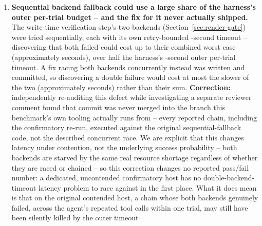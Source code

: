 \documentclass[11pt]{article}
\DeclareRobustCommand{\claim}[2]{#2}
\begin{document}
\begin{enumerate}
  (Section~\ref{sec:methods-statistics}), citation's reported numbers were never regenerated, so
  a -second timeout still counted as a failure. A later audit re-ran the fixed script on the same
  run data, moving citation's treatment arm to \% ($n=\val{single.cite.treatment.n}$); no code changed.
\item\label{def:seq-fallback} \claim{defect-6-numbered-refs}{\claim{concurrent-fallback-fix-never-shipped}{\textbf{Sequential backend fallback could use a large share of the harness's outer
  per-trial budget -- and \claim{defects-all-fixed-status}{the fix for it never actually shipped.}}}} \claim{sequential-backend-fallback-order}{The write-time verification
  step's two backends (Section~\ref{sec:render-gate})
  were tried sequentially,} each with its own retry-bounded -second timeout -- discovering that
  both failed could cost up to their combined worst case (approximately  seconds), \claim{per-trial-timeout-history}{over half
  the harness's \val{harness.timeout_raised_s}-second outer per-trial timeout.} A fix racing both backends concurrently
  instead was written and committed, so discovering a double failure would cost at most the
  slower of the two (approximately  seconds) rather than their sum. \textbf{Correction:}
  \claim{defects-all-fixed-status}{\claim{concurrent-fallback-fix-never-shipped}{independently re-auditing this defect while investigating a separate reviewer comment found
  that commit was never merged into the branch this benchmark's own tooling actually runs
  from -- \claim{sequential-backend-fallback-order}{every reported chain, including the confirmatory re-run, executed against the
  original sequential-fallback code, not the described concurrent race.}}} We are explicit that
  this changes latency under contention, not the underlying success probability -- both
  backends are starved by the same real resource shortage regardless of whether they are raced
  or chained -- so this correction changes no reported pass/fail number: \claim{rerun-identical-benchmark-dedicated-host}{a dedicated,
  uncontended confirmatory host has no double-backend-timeout latency problem to race against
  in the first place.} What it does mean is that on the original contended host, a chain whose
  both backends genuinely failed, across the agent's repeated tool calls within one trial, may still have been silently killed by the outer timeout

\end{enumerate}
\end{document}
